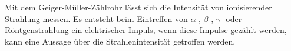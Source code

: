 Mit dem Geiger-Müller-Zählrohr lässt sich die Intensität von ionisierender Strahlung messen.
Es entsteht beim Eintreffen von $\alpha$-, $\beta$-, $\gamma$- oder Röntgenstrahlung ein elektrischer Impuls, wenn 
diese Impulse gezählt werden, kann eine Aussage über die Strahlenintensität getroffen werden.